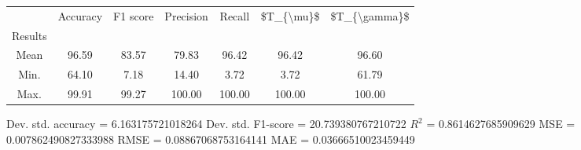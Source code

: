 \begin{tabular}{|c|c|c|c|c|c|c|}
\toprule
{} &  Accuracy &  F1 score &  Precision &  Recall &  \$T\_\{\textbackslash mu\}\$ &  \$T\_\{\textbackslash gamma\}\$ \\
Results &           &           &            &         &            &               \\
\hline
Mean    &     96.59 &     83.57 &      79.83 &   96.42 &      96.42 &         96.60 \\
Min.    &     64.10 &      7.18 &      14.40 &    3.72 &       3.72 &         61.79 \\
Max.    &     99.91 &     99.27 &     100.00 &  100.00 &     100.00 &        100.00 \\
\bottomrule
\end{tabular}

 Dev. std. accuracy = 6.163175721018264
 Dev. std. F1-score = 20.739380767210722
 $R^2$ = 0.8614627685909629
 MSE = 0.007862490827333988
 RMSE = 0.08867068753164141
 MAE = 0.03666510023459449